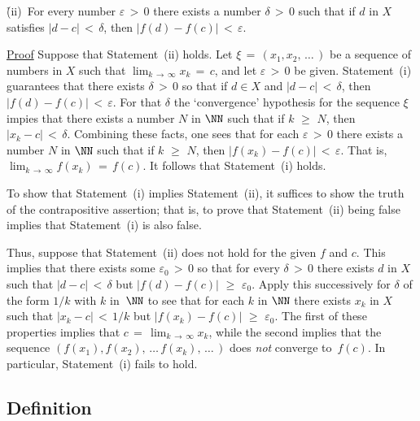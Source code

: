 \V

        \h (ii)\, For every number ${\varepsilon}\,>\,0$ there exists a number ${\delta}\,>\,0$ such that if $d$ in $X$ satisfies $|d-c|\,<\,{\delta}$, then $|f(d)-f(c)|\,<\,{\varepsilon}$.

\V

        \underline{Proof} Suppose that Statement~(ii) holds. Let ${\xi} \,=\, (x_{1},x_{2},\,{\ldots}\,)$
    be a sequence of numbers in $X$ such that $\lim_{k \,{\rightarrow}\, {\infty}} x_{k} \,=\, c$, and let ${\varepsilon}\,>\,0$ be given.
    Statement~(i) guarantees that there exists ${\delta}\,>\,0$ so that if $d{\in}X$ and $|d-c|\,<\,{\delta}$, then $|f(d)-f(c)|\,<\,{\varepsilon}$.
    For that ${\delta}$ the `convergence' hypothesis for the sequence ${\xi}$ impies that there exists a number $N$ in ${\NN}$ such that if $k\,\,{\geq}\,\,N$, then $|x_{k}-c|\,<\,{\delta}$.
    Combining these facts, one sees that for each ${\varepsilon}\,>\,0$ there exists a number $N$ in ${\NN}$ such that if $k\,\,{\geq}\,\,N$,
    then $|f(x_{k})-f(c)|\,<\,{\varepsilon}$. That is, $\lim_{k \,{\rightarrow}\, {\infty}} f(x_{k}) \,=\, f(c)$. It follows that Statement~(i) holds.

\V

        To show that Statement~(i) implies Statement~(ii), it suffices to show the truth of the contrapositive assertion;
    that is, to prove that Statement~(ii) being false implies that Statement~(i) is also false.

        Thus, suppose that Statement~(ii) does not hold for the given $f$ and $c$.
    This implies that there exists some ${\varepsilon}_{0}\,>\,0$ so that for every ${\delta}\,>\,0$
    there exists $d$ in $X$ such that $|d-c|\,<\,{\delta}$ but $|f(d)-f(c)|\,\,{\geq}\,\,{\varepsilon}_{0}$.
    Apply this successively for ${\delta}$ of the form $1/k$ with $k$ in~${\NN}$ to see that for each $k$ in ${\NN}$ there exists $x_{k}$ in $X$
    such that $|x_{k}-c|\,<\,1/k$ but $|f(x_{k})-f(c)|\,\,{\geq}\,\,{\varepsilon}_{0}$.
    The first of these properties implies that $c \,=\, \lim_{k \,{\rightarrow}\, {\infty}} x_{k}$, while the second implies that the sequence
    $(f(x_{1}), f(x_{2}),\,{\ldots}\,f(x_{k}),\,{\ldots}\,)$ does {\em not} converge to~$f(c)$. In particular, Statement~(i) fails to hold.

\VV

            \subsection{\small{\bf Definition}}
            \label{DefD20.30}%

